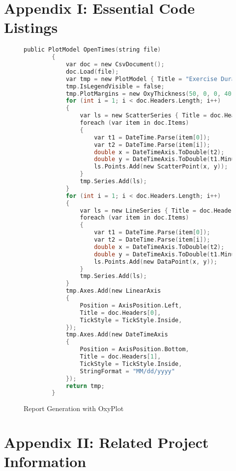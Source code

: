 \documentclass[onecolumn, draftclsnofoot,10pt, compsoc]{IEEEtran}
\begin{document}
\section{Appendix I: Essential Code Listings}
\begin{figure}[H]
\begin{lstlisting}[language=C, style=customc]
 public PlotModel OpenTimes(string file)
        {
            var doc = new CsvDocument();
            doc.Load(file);
            var tmp = new PlotModel { Title = "Exercise Duration Over Time" };
            tmp.IsLegendVisible = false;
            tmp.PlotMargins = new OxyThickness(50, 0, 0, 40);
            for (int i = 1; i < doc.Headers.Length; i++)
            {
                var ls = new ScatterSeries { Title = doc.Headers[i] };
                foreach (var item in doc.Items)
                {
                    var t1 = DateTime.Parse(item[0]);
                    var t2 = DateTime.Parse(item[i]);
                    double x = DateTimeAxis.ToDouble(t2);
                    double y = DateTimeAxis.ToDouble(t1.Minute);
                    ls.Points.Add(new ScatterPoint(x, y));
                }
                tmp.Series.Add(ls);
            }
            for (int i = 1; i < doc.Headers.Length; i++)
            {
                var ls = new LineSeries { Title = doc.Headers[i] };
                foreach (var item in doc.Items)
                {
                    var t1 = DateTime.Parse(item[0]);
                    var t2 = DateTime.Parse(item[i]);
                    double x = DateTimeAxis.ToDouble(t2);
                    double y = DateTimeAxis.ToDouble(t1.Minute);
                    ls.Points.Add(new DataPoint(x, y));
                }
                tmp.Series.Add(ls);
            }
            tmp.Axes.Add(new LinearAxis
            {
                Position = AxisPosition.Left,
                Title = doc.Headers[0],
                TickStyle = TickStyle.Inside,
            });
            tmp.Axes.Add(new DateTimeAxis
            {
                Position = AxisPosition.Bottom,
                Title = doc.Headers[1],
                TickStyle = TickStyle.Inside,
                StringFormat = "MM/dd/yyyy"
            });
            return tmp;
        }
\end{lstlisting}
\caption{Report Generation with OxyPlot}
\end{figure}
\section{Appendix II: Related Project Information}



\end{document}
